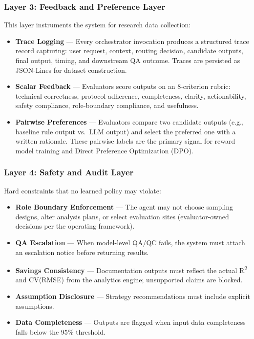 \documentclass[11pt,a4paper]{article}
\begin{document}
\subsubsection{Layer 3: Feedback and Preference Layer}
This layer instruments the system for research data collection:
\begin{itemize}
    \item \textbf{Trace Logging} — Every orchestrator invocation produces a structured trace record capturing: user request, context, routing decision, candidate outputs, final output, timing, and downstream QA outcome. Traces are persisted as JSON-Lines for dataset construction.
    \item \textbf{Scalar Feedback} — Evaluators score outputs on an 8-criterion rubric: technical correctness, protocol adherence, completeness, clarity, actionability, safety compliance, role-boundary compliance, and usefulness.
    \item \textbf{Pairwise Preferences} — Evaluators compare two candidate outputs (e.g., baseline rule output vs.\ LLM output) and select the preferred one with a written rationale. These pairwise labels are the primary signal for reward model training and Direct Preference Optimization (DPO).
\end{itemize}

\subsubsection{Layer 4: Safety and Audit Layer}
Hard constraints that no learned policy may violate:
\begin{itemize}
    \item \textbf{Role Boundary Enforcement} — The agent may not choose sampling designs, alter analysis plans, or select evaluation sites (evaluator-owned decisions per the operating framework).
    \item \textbf{QA Escalation} — When model-level QA/QC fails, the system must attach an escalation notice before returning results.
    \item \textbf{Savings Consistency} — Documentation outputs must reflect the actual R\textsuperscript{2} and CV(RMSE) from the analytics engine; unsupported claims are blocked.
    \item \textbf{Assumption Disclosure} — Strategy recommendations must include explicit assumptions.
    \item \textbf{Data Completeness} — Outputs are flagged when input data completeness falls below the 95\% threshold.
\end{itemize}
\end{document}
